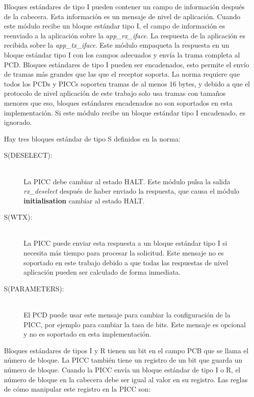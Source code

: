 \documentclass[a4paper, twoside, 11pt]{report}
\begin{document}
Bloques estándares de tipo I pueden contener un campo de información después de la cabecera. Esta información es un mensaje de nivel de aplicación. Cuando este módulo recibe un bloque estándar tipo I, el campo de información es reenviado a la aplicación sobre la \textit{app\_rx\_iface}. La respuesta de la aplicación es recibida sobre la \textit{app\_tx\_iface}. Este módulo empaqueta la respuesta en un bloque estándar tipo I con los campos adecuados y envía la trama completa al PCD. Bloques estándares de tipo I pueden ser encadenados, esto permite el envío de tramas más grandes que las que el receptor soporta. La norma requiere que todos los PCDs y PICCs soporten tramas de al menos 16 bytes, y debido a que el protocolo de nivel aplicación de este trabajo solo usa tramas con tamaños menores que eso, bloques estándares encadenados no son soportados en esta implementación. Si este módulo recibe un bloque estándar tipo I encadenado, es ignorado.

Hay tres bloques estándar de tipo S definidos en la norma:

\begin{description}
  \item[S(DESELECT):] \hfill \\ La PICC debe cambiar al estado HALT. Este módulo pulsa la salida \textit{rx\_deselect} después de haber enviado la respuesta, que causa el módulo \textbf{initialisation} cambiar al estado HALT.
  \item[S(WTX):] \hfill \\ La PICC puede enviar esta respuesta a un bloque estándar tipo I si necesita más tiempo para procesar la solicitud. Este mensaje no es soportado en este trabajo debido a que todas las respuestas de nivel aplicación pueden ser calculado de forma inmediata.
  \item[S(PARAMETERS):] \hfill \\ El PCD puede usar este mensaje para cambiar la configuración de la PICC, por ejemplo para cambiar la tasa de bits. Este mensaje es opcional y no es soportado en esta implementación.
\end{description}

Bloques estándares de tipos I y R tienen un bit en el campo PCB que se llama el número de bloque. La PICC también tiene un registro de un bit que guarda un número de bloque. Cuando la PICC envía un bloque estándar de tipo I o R, el número de bloque en la cabecera debe ser igual al valor en su registro. Las reglas de cómo manipular este registro en la PICC son:
\end{document}
